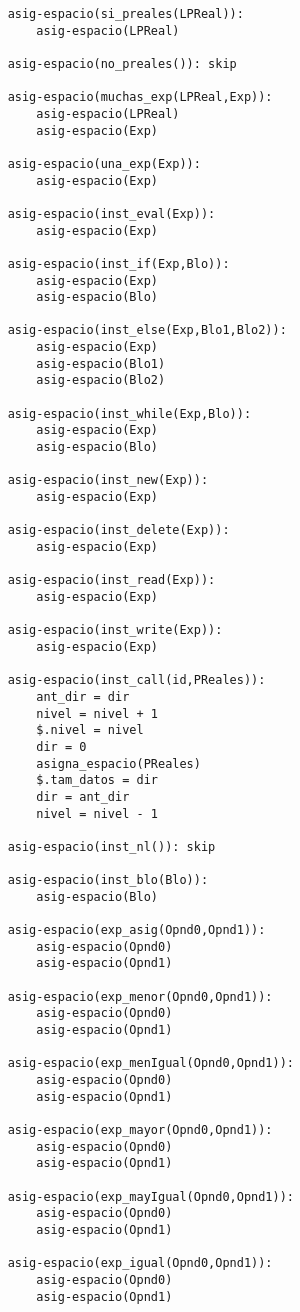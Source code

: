 \begin{lstlisting}
    asig-espacio(si_preales(LPReal)):
        asig-espacio(LPReal)

    asig-espacio(no_preales()): skip

    asig-espacio(muchas_exp(LPReal,Exp)):
        asig-espacio(LPReal)
        asig-espacio(Exp)

    asig-espacio(una_exp(Exp)):
        asig-espacio(Exp)

    asig-espacio(inst_eval(Exp)):
        asig-espacio(Exp)

    asig-espacio(inst_if(Exp,Blo)):
        asig-espacio(Exp)
        asig-espacio(Blo)

    asig-espacio(inst_else(Exp,Blo1,Blo2)):
        asig-espacio(Exp)
        asig-espacio(Blo1)
        asig-espacio(Blo2)

    asig-espacio(inst_while(Exp,Blo)):
        asig-espacio(Exp)
        asig-espacio(Blo)

    asig-espacio(inst_new(Exp)):
        asig-espacio(Exp)

    asig-espacio(inst_delete(Exp)):
        asig-espacio(Exp)

    asig-espacio(inst_read(Exp)):
        asig-espacio(Exp)

    asig-espacio(inst_write(Exp)):
        asig-espacio(Exp)

    asig-espacio(inst_call(id,PReales)):
        ant_dir = dir 
        nivel = nivel + 1
        $.nivel = nivel
        dir = 0 
        asigna_espacio(PReales)
        $.tam_datos = dir 
        dir = ant_dir 
        nivel = nivel - 1 

    asig-espacio(inst_nl()): skip

    asig-espacio(inst_blo(Blo)):
        asig-espacio(Blo)

    asig-espacio(exp_asig(Opnd0,Opnd1)):
        asig-espacio(Opnd0)
        asig-espacio(Opnd1)

    asig-espacio(exp_menor(Opnd0,Opnd1)):
        asig-espacio(Opnd0)
        asig-espacio(Opnd1)

    asig-espacio(exp_menIgual(Opnd0,Opnd1)):
        asig-espacio(Opnd0)
        asig-espacio(Opnd1)

    asig-espacio(exp_mayor(Opnd0,Opnd1)):
        asig-espacio(Opnd0)
        asig-espacio(Opnd1)

    asig-espacio(exp_mayIgual(Opnd0,Opnd1)):
        asig-espacio(Opnd0)
        asig-espacio(Opnd1)

    asig-espacio(exp_igual(Opnd0,Opnd1)):
        asig-espacio(Opnd0)
        asig-espacio(Opnd1)


\end{lstlisting}
